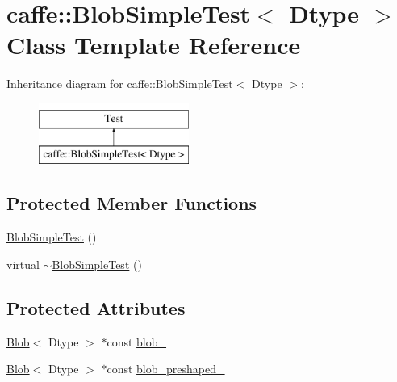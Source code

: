 \hypertarget{classcaffe_1_1_blob_simple_test}{\section{caffe\+:\+:Blob\+Simple\+Test$<$ Dtype $>$ Class Template Reference}
\label{classcaffe_1_1_blob_simple_test}
}
Inheritance diagram for caffe\+:\+:Blob\+Simple\+Test$<$ Dtype $>$\+:\begin{figure}[H]
\begin{center}
\leavevmode
\includegraphics[height=2.000000cm]{classcaffe_1_1_blob_simple_test}
\end{center}
\end{figure}
\subsection*{Protected Member Functions}
\begin{DoxyCompactItemize}
\item 
\hyperlink{classcaffe_1_1_blob_simple_test_ab5df4d4985aa07d6452e74cfcc7635d9}{Blob\+Simple\+Test} ()
\item 
virtual \hyperlink{classcaffe_1_1_blob_simple_test_afc7c73bd24a7dd3c475b43617276750c}{$\sim$\+Blob\+Simple\+Test} ()
\end{DoxyCompactItemize}
\subsection*{Protected Attributes}
\begin{DoxyCompactItemize}
\item 
\hyperlink{classcaffe_1_1_blob}{Blob}$<$ Dtype $>$ $\ast$const \hyperlink{classcaffe_1_1_blob_simple_test_a3e468873646ed610428bf0736e848fdd}{blob\+\_\+}
\item 
\hyperlink{classcaffe_1_1_blob}{Blob}$<$ Dtype $>$ $\ast$const \hyperlink{classcaffe_1_1_blob_simple_test_a3614f695be135a4414285ce66bc67a20}{blob\+\_\+preshaped\+\_\+}
\end{DoxyCompactItemize}


